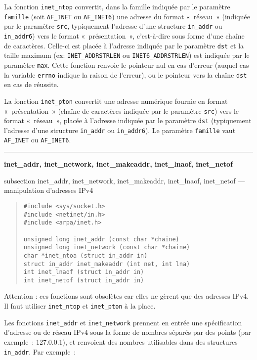 \documentclass [twoside] {report}
\newcommand {\primitive} [1]
    {
	{\large \bf #1}
	\addcontentsline {toc} {subsection} {#1}
    }
\newcommand {\separation}
    {
	\vspace {7mm}
	\nopagebreak
	\hrule
    }
\begin{document}
La fonction \texttt {inet\_ntop} convertit, dans la famille indiquée
par le paramètre \texttt {famille} (soit \texttt {AF\_INET} ou
\texttt {AF\_INET6}) une adresse du format «~réseau~» (indiquée par
le paramètre \texttt {src}, typiquement l'adresse d'une structure
\texttt {in\_addr} ou \texttt {in\_addr6}) vers le format
«~présentation~», c'est-à-dire sous forme d'une chaîne de caractères.
Celle-ci est placée à l'adresse indiquée par le paramètre \texttt
{dst} et la taille maximum (ex: \texttt {INET\_ADDRSTRLEN} ou \texttt
{INET6\_ADDRSTRLEN}) est indiquée par le paramètre \texttt {max}.
Cette fonction renvoie le pointeur nul en cas d'erreur (auquel cas
la variable \texttt {errno} indique la raison de l'erreur), ou le
pointeur vers la chaîne \texttt {dst} en cas de réussite.

La fonction \texttt {inet\_pton} convertit une adresse numérique
fournie en format «~présentation~» (chaîne de caractères indiquée
par le paramètre \texttt {src}) vers le format «~réseau~», placée
à l'adresse indiquée par le paramètre \texttt {dst} (typiquement
l'adresse d'une structure \texttt {in\_addr} ou \texttt {in\_addr6}).
Le paramètre \texttt {famille} vaut \texttt {AF\_INET} ou \texttt
{AF\_INET6}.


\separation
\primitive {inet\_addr, inet\_network, inet\_makeaddr, inet\_lnaof,
inet\_netof} --- manipulation d'adresses IPv4

\begin {quote}
\begin {verbatim}
#include <sys/socket.h>
#include <netinet/in.h>
#include <arpa/inet.h>

unsigned long inet_addr (const char *chaine)
unsigned long inet_network (const char *chaine)
char *inet_ntoa (struct in_addr in)
struct in_addr inet_makeaddr (int net, int lna)
int inet_lnaof (struct in_addr in)
int inet_netof (struct in_addr in)
\end{verbatim}
\end {quote}

Attention : ces fonctions sont obsolètes car elles ne gèrent que
des adresses IPv4. Il faut utiliser \texttt {inet\_ntop} et \texttt
{inet\_pton} à la place.

Les fonctions {\tt inet\_addr} et {\tt inet\_network} prennent en entrée
une spécification d'adresse ou de réseau IPv4 sous la forme de nombres
séparés par des points (par exemple~: 127.0.0.1), et renvoient des
nombres utilisables dans des structures {\tt in\_addr}. Par exemple~:
\end{document}
